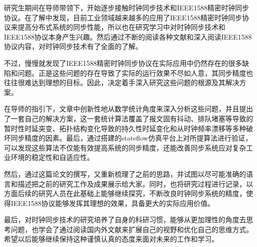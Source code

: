 
\begin{summary}
研究生期间在导师带领下，开始逐步接触时钟同步技术和IEEE1588精密时钟同步协议。在了解中发现，目前工业领域越来越多的应用了IEEE1588精密时钟同步协议来提高分布式系统的同步性能，所以也在研究学习中对时钟同步技术和IEEE1588协议本身产生兴趣。然后通过不断的阅读各种文献和深入阅读IEEE1588协议内容，对时钟同步技术有了全面的了解。

不过，慢慢就发现了IEEE1588精密时钟同步协议在实际应用中仍然存在的很多缺陷和问题。正是这些问题的存在导致了实际的运行效果不尽如人意，其同步精度也往往很难达到理想的目标。因此，决定着手深入研究这些问题的根源及其解决方案。

在导师的指引下，文章中创新性地从数学统计角度来深入分析这些问题，并且提出了一套自己的解决方案，这一套统计算法覆盖了报文固有抖动、排队堵塞等导致的暂时性时延突变、拓扑结构变化导致的持久性时延变化和从时钟频率漂移等多种破坏同步精度的因素。最后，通过搭建的stateflow仿真平台上对所提算法进行验证，可以发现这些算法不仅能有效提高系统的同步精度，还能改善同步系统应对复杂工业环境的稳定性和自适应性。

然后，通过这篇论文的撰写，又重新梳理了之前的思路，并试图以尽可能准确的语言和描述把之前的研究工作及成果展示给大家。同时，也将研究过程进行记录，以方面后续的研究人员在此基础上能够继续探究，不断改良时钟同步系统的精度，使得IEEE1588协议能够发挥其理想的效果，具备更大的实际应用价值。

最后，对时钟同步技术的研究培养了自身的科研习惯，能够从更加理性的角度去思考问题，也学会了通过阅读国内外文献来扩展自己的视野和优化自己的思维方式。希望以后能够继续保持这种谨慎认真的态度来面对未来的工作和学习。

\end{summary}
